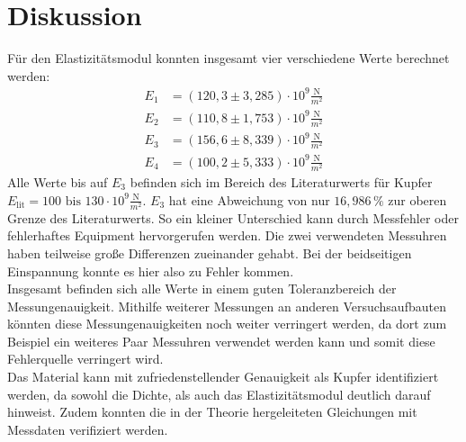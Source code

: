 \section{Diskussion}
\label{sec:Diskussion}
Für den Elastizitätsmodul konnten insgesamt vier verschiedene Werte berechnet werden:
\begin{align*}
    E_1 &= (120{,}3 \pm 3{,}285) \cdot \mathrm{10^{9}} \frac{\mathrm{N}}{m^2} \\
    E_2 &= (110{,}8 \pm 1{,}753) \cdot \mathrm{10^{9}} \frac{\mathrm{N}}{m^2} \\
    E_3 &= (156{,}6 \pm 8{,}339) \cdot \mathrm{10^{9}} \frac{\mathrm{N}}{m^2} \\
    E_4 &= (100{,}2 \pm 5{,}333) \cdot \mathrm{10^{9}} \frac{\mathrm{N}}{m^2}
\end{align*}
Alle Werte bis auf $E_3$ befinden sich im Bereich des Literaturwerts für Kupfer $E_{\mathrm{lit}} = 100 \text{ bis } 130 \cdot \mathrm{10^{9}} \frac{\mathrm{N}}{m^2}$\cite{Kupfer}.
$E_3$ hat eine Abweichung von nur $16,986 \, \%$ zur oberen Grenze des Literaturwerts. So ein kleiner Unterschied kann durch Messfehler oder fehlerhaftes Equipment
hervorgerufen werden. Die zwei verwendeten Messuhren haben teilweise große Differenzen zueinander gehabt. Bei der beidseitigen Einspannung konnte es hier also zu Fehler kommen.\\
Insgesamt befinden sich alle Werte in einem guten Toleranzbereich der Messungenauigkeit. Mithilfe weiterer Messungen an anderen Versuchsaufbauten könnten diese
Messungenauigkeiten noch weiter verringert werden, da dort zum Beispiel ein weiteres Paar Messuhren verwendet werden kann und somit diese Fehlerquelle verringert wird.\\
Das Material kann mit zufriedenstellender Genauigkeit als Kupfer identifiziert werden, da sowohl die Dichte, als auch das Elastizitätsmodul deutlich darauf hinweist. Zudem
konnten die in der Theorie hergeleiteten Gleichungen mit Messdaten verifiziert werden.

\newpage
